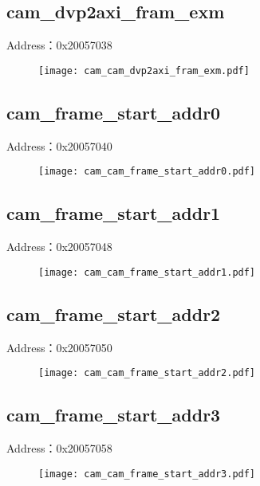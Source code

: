 \subsection{cam\_dvp2axi\_fram\_exm}
\label{cam-cam-dvp2axi-fram-exm}
Address：0x20057038
 \begin{figure}[H]
\texttt{[image: cam\_cam\_dvp2axi\_fram\_exm.pdf]}
\end{figure}

\subsection{cam\_frame\_start\_addr0}
\label{cam-cam-frame-start-addr0}
Address：0x20057040
 \begin{figure}[H]
\texttt{[image: cam\_cam\_frame\_start\_addr0.pdf]}
\end{figure}

\subsection{cam\_frame\_start\_addr1}
\label{cam-cam-frame-start-addr1}
Address：0x20057048
 \begin{figure}[H]
\texttt{[image: cam\_cam\_frame\_start\_addr1.pdf]}
\end{figure}

\subsection{cam\_frame\_start\_addr2}
\label{cam-cam-frame-start-addr2}
Address：0x20057050
 \begin{figure}[H]
\texttt{[image: cam\_cam\_frame\_start\_addr2.pdf]}
\end{figure}

\subsection{cam\_frame\_start\_addr3}
\label{cam-cam-frame-start-addr3}
Address：0x20057058
 \begin{figure}[H]
\texttt{[image: cam\_cam\_frame\_start\_addr3.pdf]}
\end{figure}

